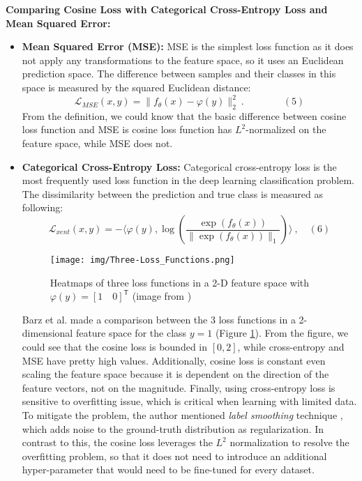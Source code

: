 \documentclass[10pt,twocolumn,letterpaper]{article}
\begin{document}
\textbf{Comparing Cosine Loss with Categorical Cross-Entropy Loss and Mean Squared Error:}
\begin{itemize}
    \item \textbf{Mean Squared Error (MSE):} MSE is the simplest loss function as it does not apply any transformations to the feature space, so it uses an Euclidean prediction space. The difference between samples and their classes in this space is measured by the squared Euclidean distance:
    \[
    \mathcal{L}_{MSE}\left(x,y\right)=\|f_{\theta}(x)-\varphi(y)\|_2^2\ .\qquad\qquad(5)
    \]
    From the definition, we could know that the basic difference between cosine loss function and MSE is cosine loss function has \(L^2\)-normalized on the feature space, while MSE does not.
    \item \textbf{Categorical Cross-Entropy Loss:} Categorical cross-entropy loss is the most frequently used loss function in the deep learning classification problem. The dissimilarity between the prediction and true class is measured as following:
    \[
    \mathcal{L}_{xent}\left(x,y\right)=- \langle\varphi(y),\log(\frac{\exp(f_{\theta}(x))}{\|\exp(f_{\theta}(x))\|_1})\rangle\ ,\quad(6)
    \]
    
    \begin{figure}[h!]
    \centering
      \texttt{[image: img/Three-Loss\_Functions.png]}
      \caption{Heatmaps of three loss functions in a 2-D feature space with \(\varphi(y)=[1\quad0]^\mathsf{T}\) (image from \cite{cosine-loss}) }
      \label{figure:three_loss_functions}
    \end{figure}

    Barz et al. made a comparison between the 3 loss functions in a 2-dimensional feature space for the class \(y=1\) (Figure \ref{figure:three_loss_functions}). From the figure, we could see that the cosine loss is bounded in \(\left[0,2\right]\), while cross-entropy and MSE have pretty high values. Additionally, cosine loss is constant even scaling the feature space because it is dependent on the direction of the feature vectors, not on the magnitude.
    \newline
    \newline
    Finally, using cross-entropy loss is sensitive to overfitting issue, which is critical when learning with limited data. To mitigate the problem, the author mentioned \textit{label smoothing} technique \cite{7780677}, which adds noise to the ground-truth distribution as regularization. In contrast to this, the cosine loss leverages the \(L^2\) normalization to resolve the overfitting problem, so that it does not need to introduce an additional hyper-parameter that would need to be fine-tuned for every dataset.
\end{itemize}
\end{document}
